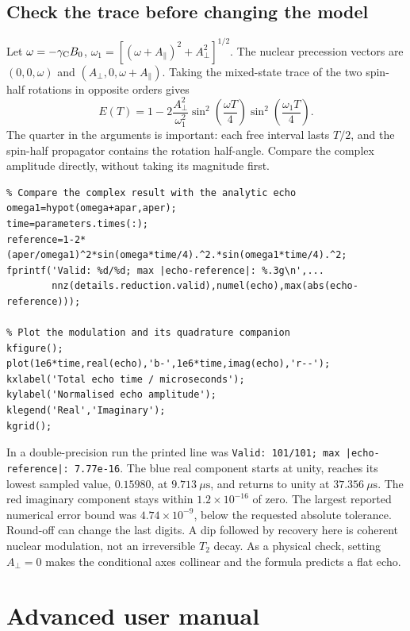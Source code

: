 \documentclass[11pt,a4paper]{article}
\newcommand{\code}[1]{\texttt{#1}}
\begin{document}
\subsection{Check the trace before changing the model}
Let $\omega=-\gamma_{\rm C}B_0$, $\omega_1=[(\omega+A_\parallel)^2+A_\perp^2]^{1/2}$. The nuclear precession vectors are $(0,0,\omega)$ and $(A_\perp,0,\omega+A_\parallel)$. Taking the mixed-state trace of the two spin-half rotations in opposite orders gives
\begin{equation}
E(T)=1-2\frac{A_\perp^2}{\omega_1^2}
\sin^2\!\left(\frac{\omega T}{4}\right)
\sin^2\!\left(\frac{\omega_1 T}{4}\right).
\end{equation}
The quarter in the arguments is important: each free interval lasts $T/2$, and the spin-half propagator contains the rotation half-angle. Compare the complex amplitude directly, without taking its magnitude first.
\begin{lstlisting}
% Compare the complex result with the analytic echo
omega1=hypot(omega+apar,aper);
time=parameters.times(:);
reference=1-2*(aper/omega1)^2*sin(omega*time/4).^2.*sin(omega1*time/4).^2;
fprintf('Valid: %d/%d; max |echo-reference|: %.3g\n',...
        nnz(details.reduction.valid),numel(echo),max(abs(echo-reference)));

% Plot the modulation and its quadrature companion
kfigure();
plot(1e6*time,real(echo),'b-',1e6*time,imag(echo),'r--');
kxlabel('Total echo time / microseconds');
kylabel('Normalised echo amplitude');
klegend('Real','Imaginary');
kgrid();
\end{lstlisting}

In a double-precision run the printed line was \code{Valid: 101/101; max |echo-reference|: 7.77e-16}. The blue real component starts at unity, reaches its lowest sampled value, $0.15980$, at $9.713~\mu\mathrm{s}$, and returns to unity at $37.356~\mu\mathrm{s}$. The red imaginary component stays within $1.2\times10^{-16}$ of zero. The largest reported numerical error bound was $4.74\times10^{-9}$, below the requested absolute tolerance. Round-off can change the last digits. A dip followed by recovery here is coherent nuclear modulation, not an irreversible $T_2$ decay. As a physical check, setting $A_\perp=0$ makes the conditional axes collinear and the formula predicts a flat echo.

\section{Advanced user manual}\label{sec:advanced}
\end{document}
